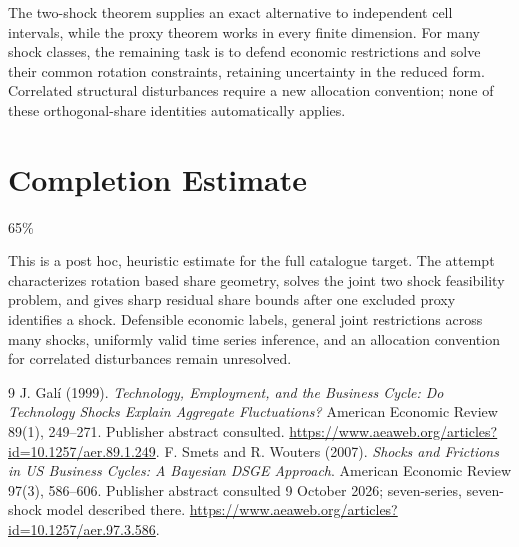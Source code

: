 \documentclass[11pt]{article}
\theoremstyle{remark}
\begin{document}
The two-shock theorem supplies an exact alternative to independent cell
intervals, while the proxy theorem works in every finite dimension. For
many shock classes, the remaining task is to defend economic restrictions
and solve their common rotation constraints, retaining uncertainty in the
reduced form. Correlated structural disturbances require a new allocation
convention; none of these orthogonal-share identities automatically applies.

\section{Completion Estimate}
65\%

This is a post hoc, heuristic estimate for the full catalogue target.
The attempt characterizes rotation based share geometry, solves the joint two shock feasibility problem, and gives sharp residual share bounds after one excluded proxy identifies a shock. Defensible economic labels, general joint restrictions across many shocks, uniformly valid time series inference, and an allocation convention for correlated disturbances remain unresolved.

\begin{thebibliography}{9}
 J. Gal\'i (1999). \emph{Technology, Employment, and the
Business Cycle: Do Technology Shocks Explain Aggregate Fluctuations?}
American Economic Review 89(1), 249--271. Publisher abstract consulted.
\url{https://www.aeaweb.org/articles?id=10.1257/aer.89.1.249}.
 F. Smets and R. Wouters (2007). \emph{Shocks and Frictions
in US Business Cycles: A Bayesian DSGE Approach}. American Economic
Review 97(3), 586--606. Publisher abstract consulted 9 October 2026;
seven-series, seven-shock model described there.
\url{https://www.aeaweb.org/articles?id=10.1257/aer.97.3.586}.
\end{thebibliography}
\end{document}
